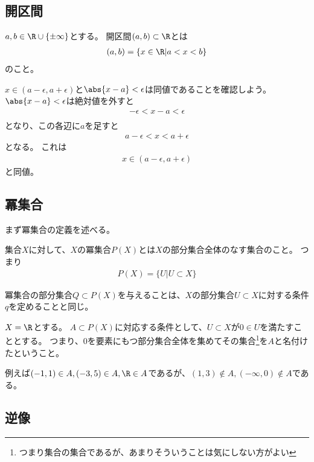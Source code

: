\documentclass[uplatex]{jsarticle}
\begin{document}
\subsection{開区間}
\begin{dfn}
  $a,b\in\R\cup\{\pm\infty\}$とする。
  開区間$(a,b)\subset\R$とは
  \begin{align*}
    (a,b)=\{x\in\R\vert a<x<b\}
  \end{align*}
  のこと。
\end{dfn}

$x\in(a-\epsilon,a+\epsilon)$と$\abs{x-a}<\epsilon$は同値であることを確認しよう。
$\abs{x-a}<\epsilon$は絶対値を外すと
\begin{align*}
  -\epsilon<x-a<\epsilon\\
\end{align*}
となり、この各辺に$a$を足すと
\begin{align*}
  a-\epsilon<x<a+\epsilon
\end{align*}
となる。
これは
\begin{align*}
  x\in(a-\epsilon,a+\epsilon)
\end{align*}
と同値。

\subsection{冪集合}
まず冪集合の定義を述べる。
\begin{dfn}[冪集合]
  集合$X$に対して、$X$の冪集合$P(X)$とは$X$の部分集合全体のなす集合のこと。
  つまり
  \begin{align*}
    P(X)=\{U\vert U\subset X\}
  \end{align*}
\end{dfn}

冪集合の部分集合$Q\subset P(X)$を与えることは、$X$の部分集合$U\subset X$に対する条件$q$を定めることと同じ。

\begin{eg}
  $X=\R$とする。
  $A\subset P(X)$に対応する条件として、$U\subset X$が$0\in U$を満たすこととする。
  つまり、$0$を要素にもつ部分集合全体を集めてその集合\footnote{つまり集合の集合であるが、あまりそういうことは気にしない方がよい}を$A$と名付けたということ。

  例えば$(-1,1)\in A, (-3,5)\in A, \R\in A$であるが、$(1,3)\notin A, (-\infty,0)\notin A$である。
\end{eg}

\subsection{逆像}
\end{document}
